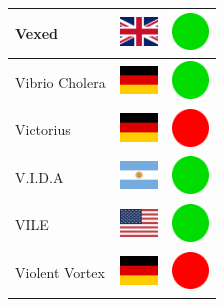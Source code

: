 \documentclass[12pt, a4paper, twoside]{report}
\begin{document}
\begin{center}
\begin{longtable}{|p{5cm}|p{2cm}|p{2cm}|}
 Vexed                                                      & \includegraphics[width=1cm]{../4x3/gb} &   \includegraphics[width=1cm]{../likes/y} \\ \hline
 Vibrio Cholera                                             & \includegraphics[width=1cm]{../4x3/de} &   \includegraphics[width=1cm]{../likes/y} \\ \hline
 Victorius                                                  & \includegraphics[width=1cm]{../4x3/de} &   \includegraphics[width=1cm]{../likes/n} \\ \hline
 V.I.D.A                                                    & \includegraphics[width=1cm]{../4x3/ar} &   \includegraphics[width=1cm]{../likes/y} \\ \hline
 VILE                                                       & \includegraphics[width=1cm]{../4x3/us} &   \includegraphics[width=1cm]{../likes/y} \\ \hline
 Violent Vortex                                             & \includegraphics[width=1cm]{../4x3/de} &   \includegraphics[width=1cm]{../likes/n} \\ \hline

\end{longtable}
\end{center}
\end{document}
